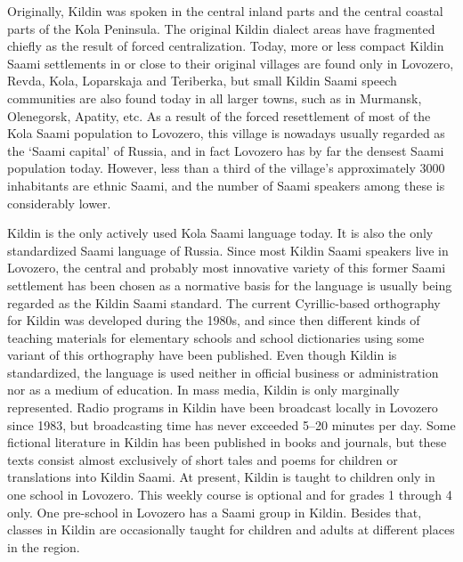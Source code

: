 \documentclass[a4paper,12pt]{article}
\begin{document}
Originally, Kildin was spoken in the central inland parts and the central coastal parts of the Kola Peninsula. The original Kildin dialect areas have fragmented chiefly as the result of forced centralization. Today, more or less compact Kildin Saami settlements in or close to their original villages are found only in Lovozero, Revda, Kola, Loparskaja and Teriberka, but small Kildin Saami speech communities are also found today in all larger towns, such as in Murmansk, Olenegorsk, Apatity, etc. As a result of the forced resettlement of most of the Kola Saami population to Lovozero, this village is nowadays usually regarded as the ‘Saami capital’ of Russia, and in fact Lovozero has by far the densest Saami population today. However, less than a third of the village’s approximately 3000 inhabitants are ethnic Saami, and the number of Saami speakers among these is considerably lower.

Kildin is the only actively used Kola Saami language today. It is also the only standardized Saami language of Russia. Since most Kildin Saami speakers live in Lovozero, the central and probably most innovative variety of this former Saami settlement has been chosen as a normative basis for the language is usually being regarded as the Kildin Saami standard. The current Cyrillic-based orthography for Kildin was developed during the 1980s, and since then different kinds of teaching materials for elementary schools and school dictionaries using some variant of this orthography have been published. Even though Kildin is standardized, the language is used neither in official business or administration nor as a medium of education. In mass media, Kildin is only marginally represented. Radio programs in Kildin have been broadcast locally  in Lovozero since 1983, but broadcasting time has never exceeded 5–20 minutes per day. Some fictional literature in Kildin has been published in books and journals, but these texts consist almost exclusively of short tales and poems for children or translations into Kildin Saami. At present, Kildin is taught to children only in one school in Lovozero. This weekly course is optional and for grades 1 through 4 only. One pre-school in Lovozero has a Saami group in Kildin. Besides that, classes in Kildin are occasionally taught for children and adults at different places in the region.
\end{document}
